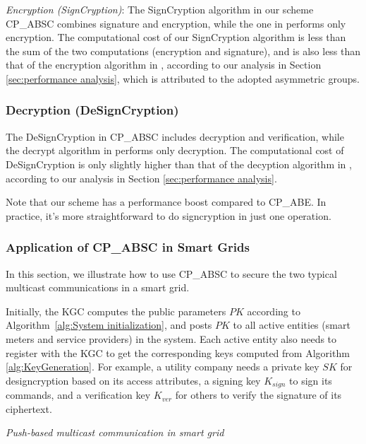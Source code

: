 \documentclass[letterpaper,12pt]{article}
\begin{document}
\emph{ Encryption (SignCryption)}: The SignCryption algorithm in our scheme CP\_ABSC combines signature and encryption, while the one in \cite{bethencourt2007ciphertext}  performs only encryption. The computational cost of our SignCryption algorithm is less than the sum of the two computations (encryption and signature), and is also less than that of the encryption algorithm in \cite{bethencourt2007ciphertext}, according to our analysis in Section \ref{sec:performance analysis}, which is attributed to the adopted asymmetric groups.

  \subsubsection {Decryption (DeSignCryption)} The DeSignCryption in CP\_ABSC includes decryption and verification, while the decrypt algorithm in \cite{bethencourt2007ciphertext} performs only decryption. The computational cost of DeSignCryption is only slightly higher than that of the decyption algorithm in \cite{bethencourt2007ciphertext}, according to our analysis in Section \ref{sec:performance analysis}.

Note that our scheme has a performance boost compared to CP\_ABE. In practice, it's more straightforward to do signcryption in just one operation.

\subsubsection{Application of CP\_ABSC in Smart Grids}\label{sec:application}

In this section, we illustrate how to use CP\_ABSC to secure the two typical multicast communications in a smart grid.  %

Initially, the KGC computes the public parameters $PK$ according to Algorithm~\ref{alg:System initialization}, and posts $PK$ to all active entities (smart meters and service providers) in the system. Each active entity also needs to register with the KGC to get the corresponding keys computed from Algorithm \ref{alg:KeyGeneration}. For example, a utility company needs a private key $SK$ for designcryption based on its access attributes, a signing key $K_{sign}$ to sign its commands, and a verification key $K_{ver}$ for others to verify the signature of its ciphertext. %

\emph{Push-based multicast communication in smart grid}
\end{document}
